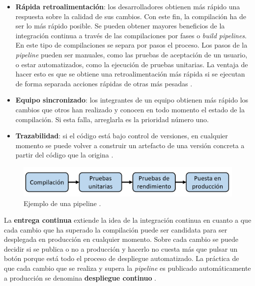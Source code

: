 \documentclass[11pt,spanish,listoffigures]{tfgetsinf}
\begin{document}
\begin{itemize}

\item \textbf{Rápida retroalimentación}: los desarrolladores obtienen más rápido una respuesta sobre la calidad de sus cambios. Con este fin, la compilación ha de ser lo más rápido posible. Se pueden obtener mayores beneficios de la integración continua a través de las compilaciones por fases o \textit{build pipelines}. En este tipo de compilaciones se separa por pasos el proceso. Los pasos de la \textit{pipeline} pueden ser manuales, como las pruebas de aceptación de un usuario, o estar automatizados, como la ejecución de pruebas unitarias. La ventaja de hacer esto es que se obtiene una retroalimentación más rápida si se ejecutan de forma separada acciones rápidas de otras más pesadas \cite{Fowler2006}.

\item \textbf{Equipo sincronizado}: los integrantes de un equipo obtienen más rápido los cambios que otros han realizado y conocen en todo momento el estado de la compilación. Si esta falla, arreglarla es la prioridad número uno.

\item \textbf{Trazabilidad}: si el código está bajo control de versiones, en cualquier momento se puede volver a construir un artefacto de una versión concreta a partir del código que la origina \cite{Newman2015a}.

\end{itemize}

\begin{figure}[h]
\centering
\includegraphics[scale=0.6]{pipeline_ES}
\caption{Ejemplo de una pipeline \cite{Newman2015a}.}
\end{figure}

La \textbf{entrega continua} extiende la idea de la integración continua en cuanto a que cada cambio que ha superado la compilación puede ser candidata para ser desplegada en producción en cualquier momento. Sobre cada cambio se puede decidir si se publica o no a producción y hacerlo no cuesta más que pulsar un botón porque está todo el proceso de despliegue automatizado. La práctica de que cada cambio que se realiza y supera la \textit{pipeline} es publicado automáticamente a producción se denomina \textbf{despliegue continuo} \cite{Fowler2013}.
\end{document}
